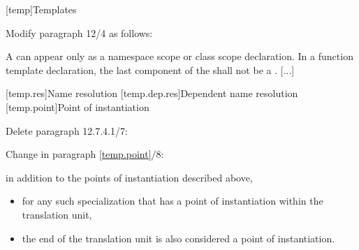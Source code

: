 \setcounter{chapter}{11}
[temp]{Templates}%

\noindent
Modify paragraph 12/4 as follows:
\begin{std.txt}
  \pnum[4]
  A  can appear only as a 
  namespace scope or class scope declaration.
  In a function template declaration, the last component of the 
   shall not be a . 
  [...]
\end{std.txt}






\setcounter{section}{6}
[temp.res]{Name resolution}
\setcounter{subsection}{3}
[temp.dep.res]{Dependent name resolution}
[temp.point]{Point of instantiation}

\noindent
Delete paragraph 12.7.4.1/7:
\begin{std.txt}
\pnum[7]
\end{std.txt}

\noindent
Change in paragraph \ref{temp.point}/8:
\begin{std.txt}
\pnum[8]
in addition to the points of instantiation described above,
\begin{itemize}
\item
for any such
specialization that has a point of instantiation within the
translation unit,
\item
{}
the end of the translation unit is also
considered a point of instantiation.
\end{itemize}
\end{std.txt}

